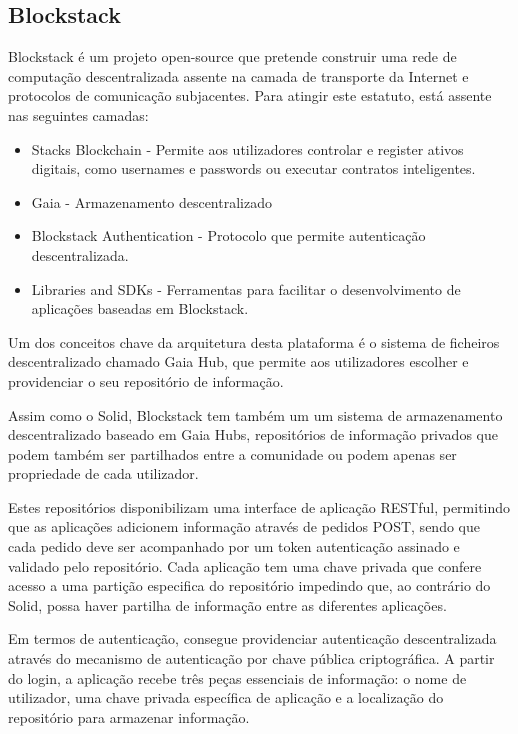 \subsection{Blockstack}
Blockstack é um projeto open-source que pretende construir uma rede de computação descentralizada assente na camada de transporte da Internet e protocolos de comunicação subjacentes. Para atingir este estatuto, está assente nas seguintes camadas:
\begin{itemize}
	\item Stacks Blockchain - Permite aos utilizadores controlar e register ativos digitais, como usernames e passwords ou executar contratos inteligentes.\cite{blockstack_white_paper}
	\item Gaia - Armazenamento descentralizado
	\item Blockstack Authentication - Protocolo que permite autenticação descentralizada.\cite{blockstack_white_paper}
	\item Libraries and SDKs - Ferramentas para facilitar o desenvolvimento de aplicações baseadas em Blockstack. \cite{blockstack_white_paper}
\end{itemize}

Um dos conceitos chave da arquitetura desta plataforma é o sistema de ficheiros descentralizado chamado Gaia Hub, que permite aos utilizadores escolher e providenciar o seu repositório de informação.

Assim como o Solid, Blockstack tem também um um sistema de armazenamento descentralizado baseado em Gaia Hubs, repositórios de informação privados que podem também ser partilhados entre a comunidade ou podem apenas ser propriedade de cada utilizador. 

Estes repositórios disponibilizam uma interface de aplicação RESTful, permitindo que as aplicações adicionem informação através de pedidos POST, sendo que cada pedido deve ser acompanhado por um token autenticação assinado e validado pelo repositório. Cada aplicação tem uma chave privada que confere acesso a uma partição especifica do repositório impedindo que, ao contrário do Solid, possa haver partilha de informação entre as diferentes aplicações.\cite{blockstack_white_paper}

Em termos de autenticação, consegue providenciar autenticação descentralizada através do mecanismo de autenticação por chave pública criptográfica. A partir do login, a aplicação recebe três peças essenciais de informação: o nome de utilizador, uma chave privada específica de aplicação e a localização do repositório para armazenar informação.\cite{blockstack_white_paper}

